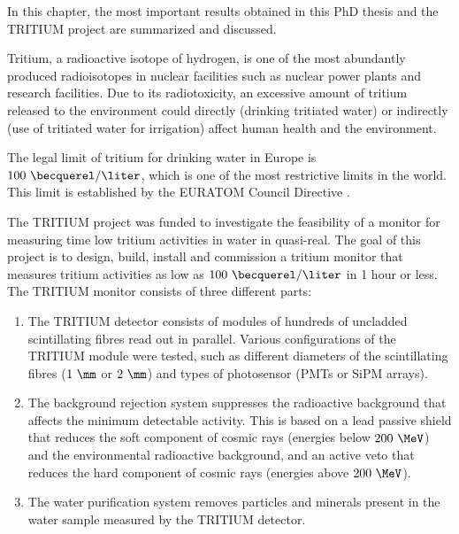 In this chapter, the most important results obtained in this PhD thesis and the TRITIUM project are summarized and discussed. 

Tritium, a radioactive isotope of hydrogen, is one of the most abundantly produced radioisotopes in nuclear facilities such as nuclear power plants and research facilities. Due to its radiotoxicity, an excessive amount of tritium released to the environment could directly (drinking tritiated water) or indirectly (use of tritiated water for irrigation) affect human health and the environment.

The legal limit of tritium for drinking water in Europe is $100~\becquerel/\liter$, which is one of the most restrictive limits in the world. This limit is established by the EURATOM Council Directive \cite{EURATOM_GL}. %

The TRITIUM project was funded to investigate the feasibility of a monitor 
for measuring time low tritium activities in water in quasi-real. The goal of this project is to design, build, install and commission a tritium monitor that measures tritium activities as low as $100~\becquerel/\liter$ in 1 hour or less. The TRITIUM monitor consists of three different parts:

\begin{enumerate}

\item{} The TRITIUM detector consists of modules of hundreds of uncladded scintillating fibres read out in parallel. Various configurations of the TRITIUM module were tested, such as different diameters of the scintillating fibres ($1~\mm$ or $2~\mm$) and types of photosensor (PMTs or SiPM arrays).

\item{} The background rejection system suppresses the radioactive background that affects the minimum detectable activity. This is based on a lead passive shield that reduces the soft component of cosmic rays (energies below $200~\MeV$) and the environmental radioactive background, and an active veto that reduces the hard component of cosmic rays (energies above $200~\MeV$).

\item{} The water purification system removes particles and minerals present in the water sample measured by the TRITIUM detector.

\end{enumerate} 

